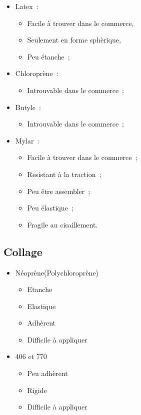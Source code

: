 \documentclass{beamer}
\begin{document}
\begin{frame}
  \begin{multicols}{2}
    \begin{itemize}
      \item Latex~:
      \begin{itemize}
        \item Facile à trouver dans le commerce,
        \item Seulement en forme sphèrique,
        \item Peu étanche~;
      \end{itemize}
      \item Chloroprène~:
      \begin{itemize}
        \item Introuvable dans le commerce~;
      \end{itemize}
      \item Butyle~:
      \begin{itemize}
        \item Introuvable dans le commerce~;
      \end{itemize}
    \end{itemize}
    \newpage
    \begin{itemize}
      \item Mylar~:
      \begin{itemize}
        \item Facile à trouver dans le commerce~;
        \item Resistant à la traction~;
        \item Peu être assembler~;
        \item Peu élastique~;
        \item Fragile au cisaillement.
      \end{itemize}
    \end{itemize}
  \end{multicols}
\end{frame}

\subsection{Collage}

\begin{frame}
  \begin{itemize}
    \item Néoprène(Polychloroprène)
    \begin{itemize}
      \item Etanche
      \item Elastique
      \item Adhèrent
      \item Difficile à appliquer
    \end{itemize}
    \item 406 et 770
    \begin{itemize}
      \item Peu adhèrent
      \item Rigide
      \item Difficile à appliquer
    \end{itemize}
  \end{itemize}
\end{frame}
\end{document}
